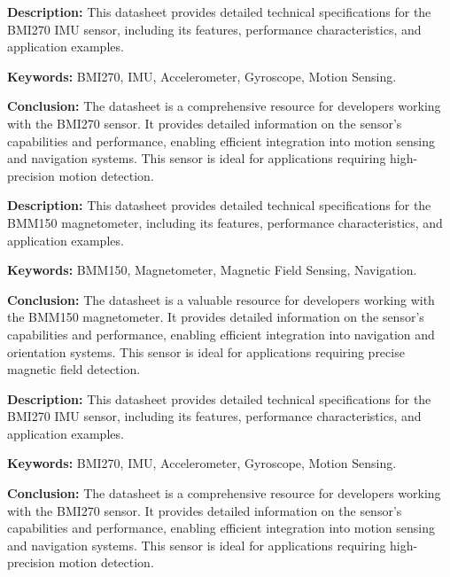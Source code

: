 {
	\textbf{Description:} This datasheet provides detailed technical specifications for the BMI270 IMU sensor, including its features, performance characteristics, and application examples.
	\newline
	
	\textbf{Keywords:} BMI270, IMU, Accelerometer, Gyroscope, Motion Sensing.
	
	\newpage
	\textbf{Conclusion:} The datasheet is a comprehensive resource for developers working with the BMI270 sensor. It provides detailed information on the sensor's capabilities and performance, enabling efficient integration into motion sensing and navigation systems. This sensor is ideal for applications requiring high-precision motion detection\cite{Bosch:2024b}.
}

{
	\textbf{Description:} This datasheet provides detailed technical specifications for the BMM150 magnetometer, including its features, performance characteristics, and application examples.
	\newline
	
	\textbf{Keywords:} BMM150, Magnetometer, Magnetic Field Sensing, Navigation.
	
	\newpage
	\textbf{Conclusion:} The datasheet is a valuable resource for developers working with the BMM150 magnetometer. It provides detailed information on the sensor's capabilities and performance, enabling efficient integration into navigation and orientation systems. This sensor is ideal for applications requiring precise magnetic field detection\cite{Bosch:2024c}.
}

{
	\textbf{Description:} This datasheet provides detailed technical specifications for the BMI270 IMU sensor, including its features, performance characteristics, and application examples.
	\newline
	
	\textbf{Keywords:} BMI270, IMU, Accelerometer, Gyroscope, Motion Sensing.
	
	\newpage
	\textbf{Conclusion:} The datasheet is a comprehensive resource for developers working with the BMI270 sensor. It provides detailed information on the sensor's capabilities and performance, enabling efficient integration into motion sensing and navigation systems. This sensor is ideal for applications requiring high-precision motion detection\cite{Bosch:2024d}.
}

